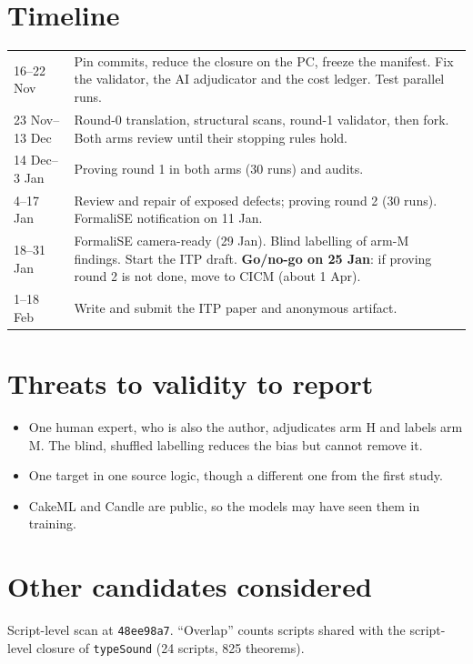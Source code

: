 \documentclass[11pt,a4paper]{article}
\newcommand{\code}[1]{\texttt{#1}}
\begin{document}
\section{Timeline}
\begin{tabularx}{\textwidth}{@{}lX@{}}
\toprule
16--22 Nov & Pin commits, reduce the closure on the PC, freeze the manifest. Fix the validator, the AI adjudicator and the cost ledger. Test parallel runs.\\
23 Nov--13 Dec & Round-0 translation, structural scans, round-1 validator, then fork. Both arms review until their stopping rules hold.\\
14 Dec--3 Jan & Proving round 1 in both arms (30 runs) and audits.\\
4--17 Jan & Review and repair of exposed defects; proving round 2 (30 runs). FormaliSE notification on 11 Jan.\\
18--31 Jan & FormaliSE camera-ready (29 Jan). Blind labelling of arm-M findings. Start the ITP draft. \textbf{Go/no-go on 25 Jan}: if proving round 2 is not done, move to CICM (about 1 Apr).\\
1--18 Feb & Write and submit the ITP paper and anonymous artifact.\\
\bottomrule
\end{tabularx}

\section{Threats to validity to report}
\begin{itemize}
\item One human expert, who is also the author, adjudicates arm H and labels arm M. The blind, shuffled labelling reduces the bias but cannot remove it.
\item One target in one source logic, though a different one from the first study.
\item CakeML and Candle are public, so the models may have seen them in training.
\end{itemize}

\appendix
\section{Other candidates considered}\label{app:candidates}
Script-level scan at \code{48ee98a7}. ``Overlap'' counts scripts shared with the script-level closure of \code{typeSound} (24 scripts, 825 theorems).
\end{document}
